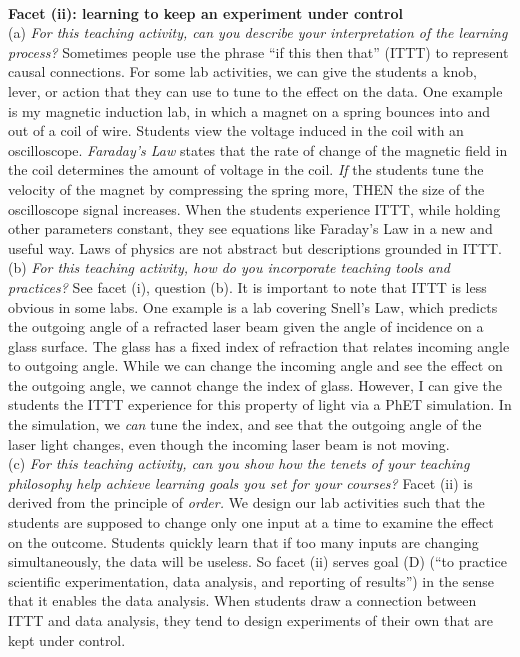 \documentclass[../../../main.tex]{subfiles}
\begin{document}
\\
\vspace{0.25cm}
\textbf{Facet (ii): learning to keep an experiment under control}
\\
\vspace{0.25cm}
(a) \textit{For this teaching activity, can you describe your interpretation of the learning process?}  Sometimes people use the phrase ``if this then that'' (ITTT) to represent causal connections.  For some lab activities, we can give the students a knob, lever, or action that they can use to tune to the effect on the data.  One example is my magnetic induction lab, in which a magnet on a spring bounces into and out of a coil of wire.  Students view the voltage induced in the coil with an oscilloscope.  \textit{Faraday's Law} states that the rate of change of the magnetic field in the coil determines the amount of voltage in the coil.  \textit{If} the students tune the velocity of the magnet by compressing the spring more, THEN the size of the oscilloscope signal increases.  When the students experience ITTT, while holding other parameters constant, they see equations like Faraday's Law in a new and useful way.  Laws of physics are not abstract but descriptions grounded in ITTT.
\\
\vspace{0.25cm}
(b) \textit{For this teaching activity, how do you incorporate teaching tools and practices?}  See facet (i), question (b).  It is important to note that ITTT is less obvious in some labs.  One example is a lab covering Snell's Law, which predicts the outgoing angle of a refracted laser beam given the angle of incidence on a glass surface.  The glass has a fixed index of refraction that relates incoming angle to outgoing angle.  While we can change the incoming angle and see the effect on the outgoing angle, we cannot change the index of glass.  However, I can give the students the ITTT experience for this property of light via a PhET simulation.  In the simulation, we \textit{can} tune the index, and see that the outgoing angle of the laser light changes, even though the incoming laser beam is not moving.
\\
\vspace{0.25cm}
(c) \textit{For this teaching activity, can you show how the tenets of your teaching philosophy help achieve learning goals you
set for your courses?}  Facet (ii) is derived from the principle of \textit{order.}  We design our lab activities such that the students are supposed to change only one input at a time to examine the effect on the outcome.  Students quickly learn that if too many inputs are changing simultaneously, the data will be useless.  So facet (ii) serves goal (D) (``to practice scientific experimentation, data analysis, and reporting of results'') in the sense that it enables the data analysis.  When students draw a connection between ITTT and data analysis, they tend to design experiments of their own that are kept under control.
\end{document}
